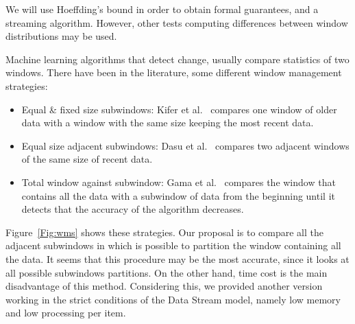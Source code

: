 We will use Hoeffding's bound in order to obtain formal guarantees, and %
a streaming algorithm.
However, other tests computing differences between window distributions may be used.
 

\BEGINOMIT
Machine learning algorithms that detect change, usually compare statistics of two windows.
There have been in the literature, some different window management strategies:
\begin{itemize}
\item Equal \& fixed size subwindows: Kifer et al.~\cite{kifer-detecting} compares one window of older data with a window with the same size keeping the most recent data.
\item Equal size adjacent subwindows: Dasu et al.~\cite{Dasu} compares two adjacent windows of the same size of recent data.
\item Total window against subwindow: Gama et al.~\cite{Gama} compares the window that contains all the data with a subwindow of data from the beginning until it detects that the accuracy of the algorithm decreases.
\end{itemize}

Figure~\ref{Fig:wms} shows these strategies.
Our proposal is to compare all the adjacent subwindows in which is possible to partition the window containing all the data.
It seems that this procedure may be the most accurate, since it looks at all possible subwindows partitions. On the other hand, time cost is the main disadvantage of this method. Considering this, we provided another version working in the strict conditions of the Data Stream model, namely low
memory and low processing per item.

